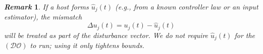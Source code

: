 \documentclass{ifacconf}
\def\V{\mathcal{V}} %
\def\N{\mathcal{N}} %
\def\LO{\mathcal{LO}} %
\def\DO{\mathcal{DO}} %
\newtheorem{remark}{\it \textbf{Remark}}%
\begin{document}


\begin{remark}\label{rem1}
If a host forms $\hat{u}_j(t)$ (e.g., from a known controller law or an input estimator), the mismatch 
\begin{equation}
    \Delta u_j(t) = u_j(t) - \hat{u}_j(t)
\end{equation}
will be treated as part of the disturbance vector. %
We do not require $\hat{u}_j(t)$ for the $(\DO)$ to run; using it only tightens bounds.
\end{remark}




\end{document}

